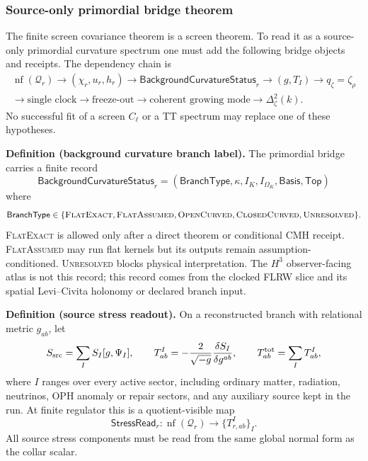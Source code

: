\subsubsection{Source-only primordial bridge theorem}\label{subsec:primordial-bridge-theorems}

The finite screen covariance theorem is a screen theorem.  To read it as a
source-only primordial curvature spectrum one must add the following bridge
objects and receipts.  The dependency chain is
\[
\boxed{
\begin{gathered}
\operatorname{nf}(\mathcal Q_r)
\to
(\chi_r,u_r,h_r)
\to
\mathsf{BackgroundCurvatureStatus}_r
\to
(g,T_I)
\to
q_\zeta=\zeta_\rho\\
\to
\text{single clock}
\to
\text{freeze-out}
\to
\text{coherent growing mode}
\to
\Delta_\zeta^2(k).
\end{gathered}
}
\]
No successful fit of a screen \(C_\ell\) or a TT spectrum may replace one of
these hypotheses.

\textbf{Definition (background curvature branch label).}\label{def:background-curvature-branch-label}
The primordial bridge carries a finite record
\[
\mathsf{BackgroundCurvatureStatus}_r
=
(\mathsf{BranchType},\kappa,I_K,I_{\Omega_K},\mathsf{Basis},\mathsf{Top})
\]
where
\[
\mathsf{BranchType}\in
\{\textsc{FlatExact},\textsc{FlatAssumed},\textsc{OpenCurved},\textsc{ClosedCurved},\textsc{Unresolved}\}.
\]
\textsc{FlatExact} is allowed only after a direct theorem or conditional CMH receipt.  \textsc{FlatAssumed}
may run flat kernels but its outputs remain assumption-conditioned.  \textsc{Unresolved} blocks
physical interpretation.  The \(H^3\) observer-facing atlas is not this record; this record comes from
the clocked FLRW slice and its spatial Levi--Civita holonomy or declared branch input.

\textbf{Definition (source stress readout).}\label{def:oph-source-stress}
On a reconstructed branch with relational metric \(g_{ab}\), let
\[
S_{\rm src}=\sum_I S_I[g,\Psi_I],
\qquad
T^I_{ab}=-\frac{2}{\sqrt{-g}}\frac{\delta S_I}{\delta g^{ab}},
\qquad
T^{\rm tot}_{ab}=\sum_I T^I_{ab},
\]
where \(I\) ranges over every active sector, including ordinary matter,
radiation, neutrinos, OPH anomaly or repair sectors, and any auxiliary source
kept in the run.  At finite regulator this is a quotient-visible map
\[
\mathsf{StressRead}_r:
\operatorname{nf}(\mathcal Q_r)\longrightarrow \{T^I_{r,ab}\}_I .
\]
All source stress components must be read from the same global normal form as
the collar scalar.

